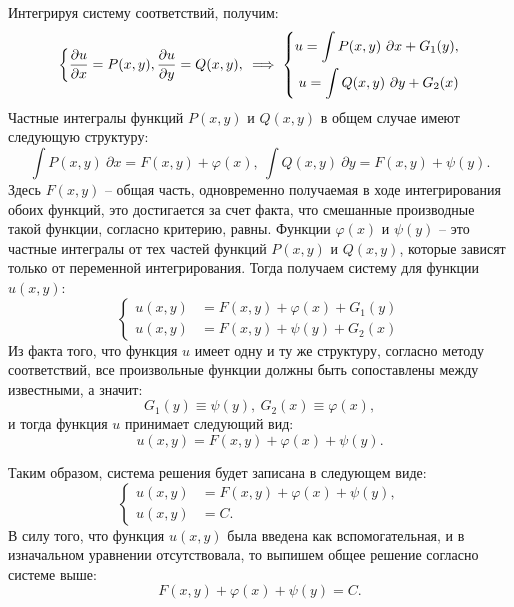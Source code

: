 	Интегрируя систему соответствий, получим:
	\[ \left\lbrace \begin{split} 
		\dfrac{\partial u}{\partial x} = P(x, y),
		\dfrac{\partial u}{\partial y} = Q(x, y),
	\end{split} \right. \implies \left\lbrace \begin{split} 
		u = \int P(x, y) ~ \partial x + G_1(y), \\
		u = \int Q(x, y) ~ \partial y + G_2(x)
	\end{split} \right. \]
	Частные интегралы функций $P(x, y)$ и $Q(x, y)$ в общем случае имеют следующую структуру:
	\[ \int P(x, y) ~ \partial x = F(x, y) + \varphi(x), ~ \int Q(x, y) ~ \partial y = F(x, y) + \psi(y). \]
	Здесь $F(x, y)$ -- общая часть, одновременно получаемая в ходе интегрирования обоих функций, это достигается за счет факта, что смешанные производные такой функции, согласно критерию, равны. Функции $\varphi(x)$ и $\psi(y)$ -- это частные интегралы от тех частей функций $P(x, y)$ и $Q(x, y)$, которые зависят только от переменной интегрирования. Тогда получаем систему для функции $u(x, y)$:
	\[ \left\lbrace \begin{split} u(x, y) &= F(x, y) + \varphi(x) + G_1(y) \\ u(x, y) &= F(x, y) + \psi(y) + G_2(x) \end{split} \right. \]
	Из факта того, что функция $u$ имеет одну и ту же структуру, согласно методу соответствий, все произвольные функции должны быть сопоставлены между известными, а значит:
	\[ G_1(y) \equiv \psi(y), ~ G_2(x) \equiv \varphi(x), \]
	и тогда функция $u$ принимает следующий вид:
	\[ u(x, y) = F(x, y) + \varphi(x) + \psi(y). \]

	Таким образом, система решения будет записана в следующем виде:
	\[ \left\lbrace \begin{split} u(x, y) &= F(x, y) + \varphi(x) + \psi(y), \\ u(x, y) &= C. \end{split} \right. \]
	В силу того, что функция $u(x, y)$ была введена как вспомогательная, и в изначальном уравнении отсутствовала, то выпишем общее решение согласно системе выше:
	\[ F(x, y) + \varphi(x) + \psi(y) = C. \]

